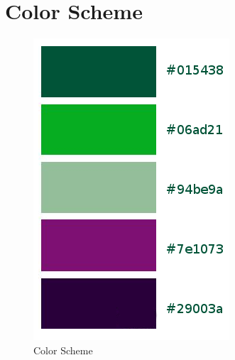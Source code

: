 \documentclass[12pt,a4paper]{report}
\begin{document}
	\section{Color Scheme}
	\begin{figure}[!h]
		\centering
		\includegraphics[scale=.5]{colors}
		\caption{Color Scheme}
		\label{fig: Color Scheme}
	\end{figure}
	\lipsum[4]
	\newpage
\end{document}
